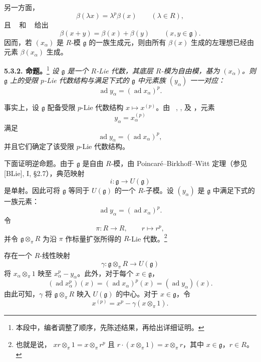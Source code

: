 另一方面，
\[
  \beta(\lambda x)=\lambda^p\beta(x)
  \qquad(\lambda\in R),
\]
且 ~ 和 ~ 给出
\[
  \beta(x+y)=\beta(x)+\beta(y)
  \qquad(x,y\in\mathfrak g).
\]
因而，若 \((x_\alpha)\) 是 \(R\)-模 \(\mathfrak g\) 的一族生成元，则由所有
\(\beta(x)\) 生成的左理想已经由元素 \(\beta(x_\alpha)\) 生成。

\medskip
\noindent\textbf{5.3.2. 命题。}\footnote{本段中，编者调整了顺序，先陈述结果，再给出详细证明。}
\label{sga3:VIIA:5.3.2}
\textit{设 \(\mathfrak g\) 是一个 \(R\)-Lie 代数，其底层 \(R\)-模为自由模，基为 \((x_\alpha)\)。则
\(\mathfrak g\) 上的受限 \(p\)-Lie 代数结构与满足下式的 \(\mathfrak g\) 中元素族 \((y_\alpha)\) 一一对应：
\[
  \operatorname{ad}y_\alpha
  =
  (\operatorname{ad}x_\alpha)^p.
\]}

事实上，设 \(\mathfrak g\) 配备受限 \(p\)-Lie 代数结构 \(x\mapsto x^{(p)}\)。由 ~,
, 及 ，元素
\[
  y_\alpha=x_\alpha^{(p)}
\]
满足
\[
  \operatorname{ad}y_\alpha
  =
  (\operatorname{ad}x_\alpha)^p,
\]
并且它们确定了该受限 \(p\)-Lie 代数结构。

下面证明逆命题。由于 \(\mathfrak g\) 是自由 \(R\)-模，由 Poincar\'e--Birkhoff--Witt 定理（参见 \textup{[BLie]}, I, \S2.7），典范映射
\[
  i:\mathfrak g\longrightarrow U(\mathfrak g)
\]
是单射。因此可将 \(\mathfrak g\) 等同于 \(U(\mathfrak g)\) 的一个 \(R\)-子模。设 \((y_\alpha)\) 是 \(\mathfrak g\) 中满足下式的一族元素：
\[
  \operatorname{ad}y_\alpha
  =
  (\operatorname{ad}x_\alpha)^p.
\]
令
\[
  \pi:R\longrightarrow R,
  \qquad
  r\longmapsto r^p,
\]
并令 \(\mathfrak g\otimes_\pi R\) 为沿 \(\pi\) 作标量扩张所得的 \(R\)-Lie 代数。\footnote{也就是说，
\(xr\otimes_\pi1=x\otimes_\pi r^p\) 且
\(r\cdot(x\otimes_\pi1)=x\otimes_\pi r\)，其中 \(x\in\mathfrak g\)，\(r\in R\)。}

存在一个 \(R\)-线性映射
\[
  \gamma:\mathfrak g\otimes_\pi R
  \longrightarrow
  U(\mathfrak g)
\]
将 \(x_\alpha\otimes_\pi1\) 映至
\(x_\alpha^p-y_\alpha\)。此外，对于每个 \(x\in\mathfrak g\)，
\[
  (\operatorname{ad}x_\alpha^p)(x)
  =
  (\operatorname{ad}x_\alpha)^p(x)
  =
  (\operatorname{ad}y_\alpha)(x).
\]
由此可知，\(\gamma\) 将 \(\mathfrak g\otimes_\pi R\) 映入
\(U(\mathfrak g)\) 的中心。对于 \(x\in\mathfrak g\)，令
\[
  x^{(p)}
  =
  x^p-\gamma(x\otimes_\pi1).
\]

